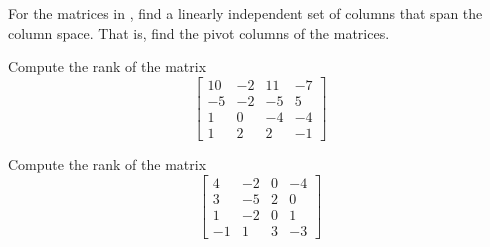 \begin{exercise}\ansMark%
For the matrices in , find
a linearly independent set of columns that span the column space.
That is, find the pivot columns of the matrices.
\end{exercise}

\begin{exercise}
Compute the rank of the matrix
\begin{equation*}
\begin{bmatrix}
10 & -2 & 11 & -7 \\ 
-5 & -2 & -5 & 5 \\
1 & 0 & -4 & -4 \\
1 & 2 & 2 & -1
\end{bmatrix} 
\end{equation*}
\end{exercise}
%

\begin{exercise}
Compute the rank of the matrix
\begin{equation*}
\begin{bmatrix}
4 & -2 & 0 & -4 \\
3 & -5 & 2 & 0 \\
1 & -2 & 0 & 1 \\
-1 & 1 & 3 & -3
\end{bmatrix} 
\end{equation*}
\end{exercise}
%

